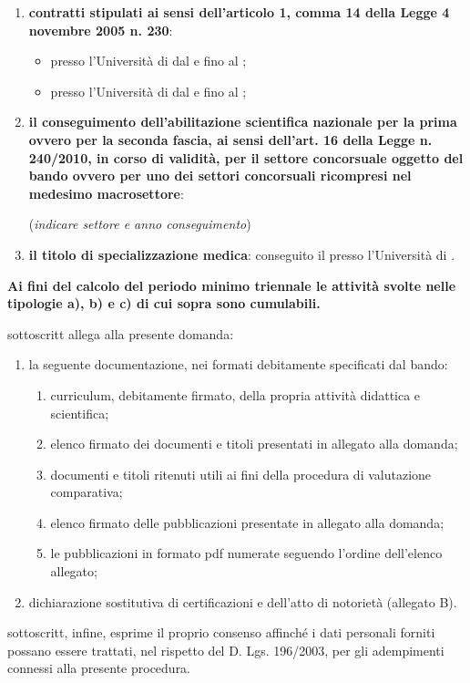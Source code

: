 \begin{enumerate}
\begin{itemize}
\begin{itemize}
\end{itemize}
\end{itemize}
\item \textbf{contratti stipulati ai sensi dell’articolo 1, comma 14 della 
Legge 4 novembre 2005 n. 230}:
\begin{itemize}
 \item presso l’Università di \myTextField[3cm]{} dal \myTextField[2cm]{} e fino 
 al \myTextField[2cm]{};
 \item presso l’Università di \myTextField[3cm]{} dal \myTextField[2cm]{} e fino 
 al \myTextField[2cm]{};
\end{itemize}
\item \textbf{il conseguimento dell’abilitazione scientifica nazionale per la 
prima ovvero per la seconda fascia, ai sensi dell’art. 16 della Legge n. 
240/2010, in corso di validità, per il settore concorsuale oggetto del bando 
ovvero per uno dei settori concorsuali ricompresi nel medesimo macrosettore}:

(\emph{indicare settore e anno conseguimento}) \myTextField{}
\item \textbf{il titolo di specializzazione medica}: conseguito il \myTextField[2cm]{} 
presso l’Università di  \myTextField{}.
\end{enumerate}
\textbf{Ai fini del calcolo del periodo minimo triennale le attività svolte 
nelle tipologie a), b) e c) di cui sopra sono cumulabili.}

\myTextField[.5cm]{} sottoscritt\myTextField[.5cm]{} allega alla presente 
domanda:
\begin{enumerate}
\item la seguente documentazione, nei formati debitamente specificati dal bando:
\begin{enumerate}[label=\emph{\roman*})]
\item curriculum, debitamente firmato, della propria attività didattica e scientifica;
\item elenco firmato dei documenti e titoli presentati in allegato alla domanda;
\item documenti e titoli ritenuti utili ai fini della procedura di valutazione 
comparativa;
\item elenco firmato delle pubblicazioni presentate in allegato alla domanda;
\item le pubblicazioni in formato pdf numerate seguendo l’ordine dell’elenco 
allegato;
\end{enumerate}
\item 	dichiarazione sostitutiva di certificazioni e dell’atto di notorietà 
(allegato B).
\end{enumerate}
\myTextField[.5cm]{} sottoscritt\myTextField[.5cm]{}, infine, esprime il proprio 
consenso affinché i dati personali forniti possano essere trattati, nel rispetto 
del D. Lgs. 196/2003, per gli adempimenti connessi alla presente procedura.
